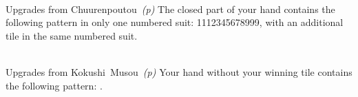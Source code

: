 	{\closedhand \\
	\upgradesfrom Upgrades from Chuurenpoutou~\textit{(p\pageref{core:yaku:Chuurenpoutou})}}
	{The closed part of your hand contains the following pattern in only one numbered suit: 1112345678999, with an additional tile in the same numbered suit.}

	{\closedhand \\
	\upgradesfrom Upgrades from Kokushi~Musou~\textit{(p\pageref{core:yaku:Kokushi Musou})}}
	{Your hand without your winning tile contains the following pattern: {}.}